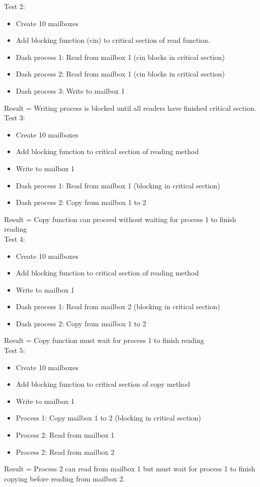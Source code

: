 \documentclass{article}
\begin{document}
Test 2:
\begin{itemize}
\item Create 10 mailboxes
\item Add blocking function (cin) to critical section of read function.
\item Dash process 1: Read from mailbox 1 (cin blocks in critical section)
\item Dash process 2: Read from mailbox 1 (cin blocks in critical section)
\item Dash process 3: Write to mailbox 1
\end{itemize}
Result = Writing process is blocked until all readers have finished critical section.\\

Test 3:
\begin{itemize}
\item Create 10 mailboxes
\item Add blocking function to critical section of reading method
\item Write to mailbox 1
\item Dash process 1: Read from mailbox 1 (blocking in critical section)
\item Dash process 2: Copy from mailbox 1 to 2
\end{itemize}
Result = Copy function can proceed without waiting for process 1 to finish reading\\

Test 4:
\begin{itemize}
\item Create 10 mailboxes
\item Add blocking function to critical section of reading method
\item Write to mailbox 1
\item Dash process 1: Read from mailbox 2 (blocking in critical section)
\item Dash process 2: Copy from mailbox 1 to 2
\end{itemize}
Result = Copy function must wait for process 1 to finish reading\\

Test 5:
\begin{itemize}
\item Create 10 mailboxes
\item Add blocking function to critical section of copy method
\item Write to mailbox 1
\item Process 1: Copy mailbox 1 to 2 (blocking in critical section)
\item Process 2: Read from mailbox 1
\item Process 2: Read from mailbox 2
\end{itemize}
Result = Process 2 can read from mailbox 1 but must wait for process 1 to finish copying before reading from mailbox 2.
\end{document}
